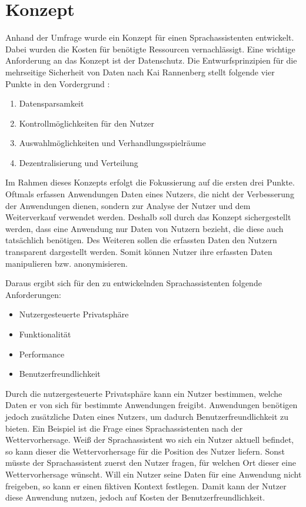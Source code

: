 \section{Konzept}\label{sec:konzept}
Anhand der Umfrage wurde ein Konzept für einen Sprachassistenten entwickelt. Dabei wurden die Kosten für benötigte Ressourcen vernachlässigt. Eine wichtige Anforderung an das Konzept ist der Datenschutz. Die Entwurfsprinzipien für die mehrseitige Sicherheit von Daten nach Kai Rannenberg stellt folgende vier Punkte in den Vordergrund \cite{kairannenberg}:

\begin{enumerate}
	\item Datensparsamkeit
	\item Kontrollmöglichkeiten für den Nutzer 
	\item Auswahlmöglichkeiten und Verhandlungsspielräume 
	\item Dezentralisierung und Verteilung
\end{enumerate} 

Im Rahmen dieses Konzepts erfolgt die Fokussierung auf die ersten drei Punkte. Oftmals erfassen Anwendungen Daten eines Nutzers, die nicht der Verbesserung der Anwendungen dienen, sondern zur Analyse der Nutzer und dem Weiterverkauf verwendet werden. Deshalb soll durch das Konzept sichergestellt werden, dass eine Anwendung nur Daten von Nutzern bezieht, die diese auch tatsächlich benötigen. Des Weiteren sollen die erfassten Daten den Nutzern transparent dargestellt werden. Somit können Nutzer ihre erfassten Daten manipulieren bzw. anonymisieren. 

Daraus ergibt sich für den zu entwickelnden Sprachassistenten folgende Anforderungen:
\begin{itemize}
	\item Nutzergesteuerte Privatsphäre
	\item Funktionalität
	\item Performance
	\item Benutzerfreundlichkeit	
\end{itemize}

Durch die nutzergesteuerte Privatsphäre kann ein Nutzer bestimmen, welche Daten er von sich für bestimmte Anwendungen freigibt. Anwendungen benötigen jedoch zusätzliche Daten eines Nutzers, um dadurch Benutzerfreundlichkeit zu bieten. Ein Beispiel ist die Frage eines Sprachassistenten nach der Wettervorhersage. Weiß der Sprachassistent wo sich ein Nutzer aktuell befindet, so kann dieser die Wettervorhersage für die Position des Nutzer liefern. Sonst müsste der Sprachassistent zuerst den Nutzer fragen, für welchen Ort dieser eine Wettervorhersage wünscht. Will ein Nutzer seine Daten für eine Anwendung nicht freigeben, so kann er einen fiktiven Kontext festlegen. Damit kann der Nutzer diese Anwendung nutzen, jedoch auf Kosten der Benutzerfreundlichkeit.